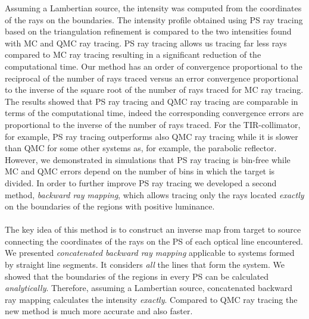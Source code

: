Assuming a Lambertian source, the intensity was computed from the coordinates of the rays on the boundaries. 
The intensity profile obtained using PS ray tracing based on the triangulation refinement is compared to the two intensities found with MC and QMC ray tracing. PS ray tracing allows us tracing far less rays compared to MC ray tracing resulting in a significant reduction of the computational time. Our method has an order of convergence proportional to the reciprocal of the number of rays traced versus an error convergence proportional to the inverse of the square root of the number of rays traced for MC ray tracing. The results showed that PS ray tracing and QMC ray tracing are comparable in terms of the computational time, indeed the corresponding convergence errors are proportional to the inverse of the number of rays traced. For the TIR-collimator, for example, PS ray tracing outperforms also QMC ray tracing while it is slower than QMC for some other systems as, for example, the parabolic reflector. However, we demonstrated in simulations that PS ray tracing is bin-free while MC and QMC errors depend on the number of bins in which the target is divided.
In order to further improve PS ray tracing we developed a second method, \emph{backward ray mapping}, which allows tracing only the rays located \emph{exactly} on the boundaries of the regions with positive luminance. 
\\ \\ \indent The key idea of this method is to construct an inverse map from target to source connecting the coordinates of the rays on the PS of each optical line encountered. \\ \indent 
We presented \emph{concatenated backward ray mapping} applicable to systems formed by straight line segments. It considers \textit{all} the lines that form the system. We showed that the boundaries of the regions in every PS can be calculated \textit{analytically}. Therefore, assuming a Lambertian source, concatenated backward ray mapping calculates the intensity \textit{exactly}. Compared to QMC ray tracing the new method is much more accurate and also faster. 

